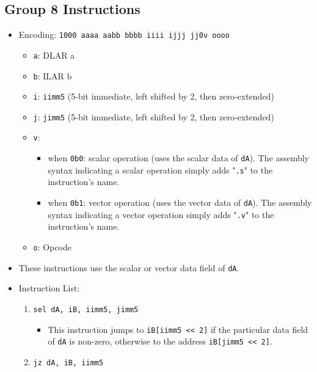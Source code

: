 \documentclass{article}
\begin{document}
	\subsection{Group 8 Instructions}
		\begin{itemize}
		\item Encoding: \texttt{1000 aaaa aabb bbbb  iiii ijjj jj0v oooo}
			\begin{itemize}
			\item \texttt{a}: DLAR a
			\item \texttt{b}: ILAR b
			\item \texttt{i}: \texttt{iimm5} (5-bit immediate, left shifted
				by 2, then zero-extended)
			\item \texttt{j}: \texttt{jimm5} (5-bit immediate, left shifted
				by 2, then zero-extended)
			\item \texttt{v}:
				\begin{itemize}
				\item when \texttt{0b0}: scalar operation (uses the scalar
					data of \texttt{dA}). The assembly syntax indicating a
					scalar operation simply adds "\texttt{.s}" to the
					instruction's name.
				\item when \texttt{0b1}: vector operation (uses the vector
					data of \texttt{dA}). The assembly syntax indicating a
					vector operation simply adds "\texttt{.v}" to the
					instruction's name.
				\end{itemize}
			\item \texttt{o}: Opcode
			\end{itemize}
		\item These instructions use the scalar or vector data field of
			\texttt{dA}.
		\item Instruction List:
			\begin{enumerate}
			\item \texttt{sel dA, iB, iimm5, jimm5}
				\begin{itemize}
				\item This instruction jumps to \texttt{iB[iimm5 << 2]} if
					the particular data field of \texttt{dA} is non-zero,
					otherwise to the address \texttt{iB[jimm5 << 2]}.
				\end{itemize}
			\item \texttt{jz dA, iB, iimm5}

\end{enumerate}
\end{itemize}
\end{document}

